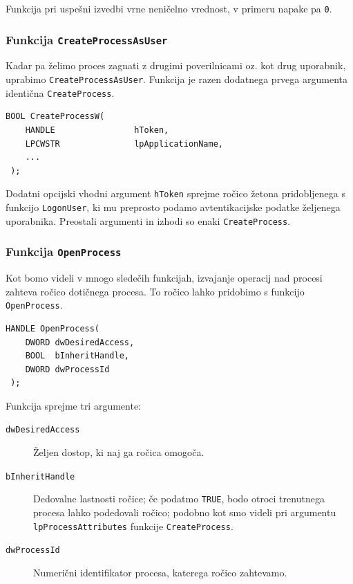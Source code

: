 \documentclass[a4paper,12pt,openright]{book}
\begin{document}
Funkcija pri uspešni izvedbi vrne neničelno vrednost, v primeru napake pa \texttt{0}.

\subsubsection{Funkcija \texttt{CreateProcessAsUser}}

Kadar pa želimo proces zagnati z drugimi poverilnicami oz. kot drug uporabnik, uprabimo \texttt{CreateProcessAsUser}.
Funkcija je razen dodatnega prvega argumenta identična \texttt{CreateProcess}.

\begin{lstlisting}[style=func]
 BOOL CreateProcessW(
	HANDLE                hToken,   
	LPCWSTR               lpApplicationName,
	...
 );
\end{lstlisting}

Dodatni opcijski vhodni argument \texttt{hToken} sprejme ročico žetona pridobljenega s funkcijo \texttt{LogonUser}, ki mu preprosto podamo avtentikacijske podatke željenega uporabnika.
Preostali argumenti in izhodi so enaki \texttt{Create\-Process}.

\subsubsection{Funkcija \texttt{OpenProcess}}

Kot bomo videli v mnogo sledečih funkcijah, izvajanje operacij nad procesi zahteva ročico dotičnega procesa.
To ročico lahko pridobimo s funkcijo \texttt{OpenProcess}.

\begin{lstlisting}[style=func]
 HANDLE OpenProcess(
	DWORD dwDesiredAccess,
	BOOL  bInheritHandle,
	DWORD dwProcessId
 );
\end{lstlisting}

Funkcija sprejme tri argumente:
\begin{description}
	\item[\texttt{dwDesiredAccess}] Željen dostop, ki naj ga ročica omogoča.
	\item[\texttt{bInheritHandle}] Dedovalne lastnosti ročice; če podatmo \texttt{TRUE}, bodo otroci trenutnega procesa lahko podedovali ročico; podobno kot smo videli pri argumentu \texttt{lpProcessAttributes} funkcije \texttt{CreateProcess}.
	\item[\texttt{dwProcessId}] Numerični identifikator procesa, katerega ročico zahtevamo.
\end{description}
\end{document}

